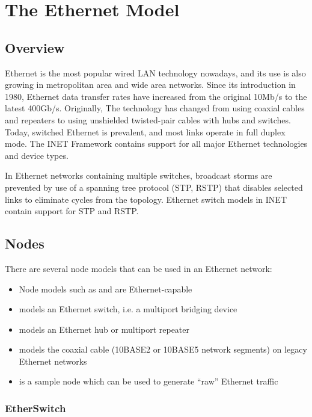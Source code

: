 \chapter{The Ethernet Model}
\label{cha:ethernet}

\section{Overview}
\label{sec:ethernet:overview}

Ethernet is the most popular wired LAN technology nowadays, and its use is also
growing in metropolitan area and wide area networks. Since its introduction in
1980, Ethernet data transfer rates have increased from the original 10Mb/s to
the latest 400Gb/s. Originally, The technology has changed from using coaxial
cables and repeaters to using unshielded twisted-pair cables with hubs and
switches. Today, switched Ethernet is prevalent, and most links operate in full
duplex mode. The INET Framework contains support for all major Ethernet
technologies and device types.

In Ethernet networks containing multiple switches, broadcast storms are
prevented by use of a spanning tree protocol (STP, RSTP) that disables selected
links to eliminate cycles from the topology. Ethernet switch models in INET
contain support for STP and RSTP.

\section{Nodes}
\label{sec:ethernet:nodes}

There are several node models that can be used in an Ethernet network:

\begin{itemize}
  \item Node models such as  and  are Ethernet-capable
  \item {} models an Ethernet switch, i.e. a multiport bridging device
  \item {} models an Ethernet hub or multiport repeater
  \item {} models the coaxial cable (10BASE2 or 10BASE5 network segments) on legacy Ethernet networks
  \item {} is a sample node which can be used to generate ``raw'' Ethernet traffic
\end{itemize}


\subsection{EtherSwitch}
\label{sec:ethernet:etherswitch}

